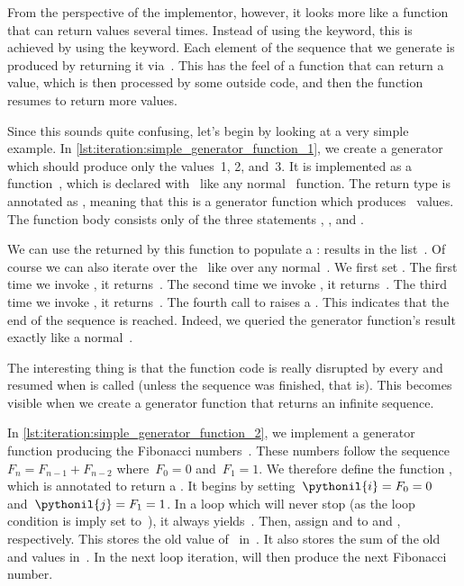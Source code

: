 From the perspective of the implementor, however, it looks more like a function that can return values several times.
Instead of using the  keyword, this is achieved by using the  keyword.
Each element of the sequence that we generate is produced by returning it via~.
This has the feel of a function that can return a value, which is then processed by some outside code, and then the function resumes to return more values.

Since this sounds quite confusing, let's begin by looking at a very simple example.
In \cref{lst:iteration:simple_generator_function_1}, we create a generator which should produce only the values~1, 2, and~3.
It is implemented as a function~, which is declared with~ like any normal \python\ function.
The return type is annotated as , meaning that this is a generator function which produces~ values.
The function body consists only of the three statements , , and .

We can use the  returned by this function to populate a :
 results in the list~\pythonil{[1, 2, 3]}.
Of course we can also iterate over the~ like over any normal~.
We first set .
The first time we invoke , it returns~.
The second time we invoke , it returns~.
The third time we invoke , it returns~.
The fourth call to  raises a .
This indicates that the end of the sequence is reached.
Indeed, we queried the generator function's result exactly like a normal~.

The interesting thing is that the function code is really disrupted by every  and resumed when  is called (unless the sequence was finished, that is).
This becomes visible when we create a generator function that returns an infinite sequence.

In \cref{lst:iteration:simple_generator_function_2}, we implement a generator function producing the Fibonacci numbers~\cite{W2024MAWWR:FN,S2022FLAATIMEOLPBOC}.
These numbers follow the sequence~$F_n=F_{n-1} + F_{n-2}$ where~$F_0=0$ and~$F_1=1$.
We therefore define the function , which is annotated to return a .
It begins by setting~$\pythonil{i}=F_0=0$ and~$\pythonil{j}=F_1=1$.
In a  loop which will never stop (as the loop condition is imply set to~), it always yields~.
Then, assign  and  to  and , respectively.
This stores the old value of~ in~.
It also stores the sum of the old  and  values in~.
In the next loop iteration,  will then produce the next Fibonacci number.

